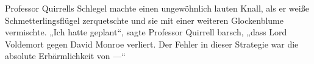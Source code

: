 Professor Quirrells Schlegel machte einen ungewöhnlich lauten Knall, als er weiße Schmetterlingsflügel zerquetschte und sie mit einer weiteren Glockenblume vermischte.
„Ich hatte geplant“, sagte Professor Quirrell barsch, „dass Lord Voldemort gegen David Monroe verliert. Der Fehler in dieser Strategie war die absolute Erbärmlichkeit von —“
